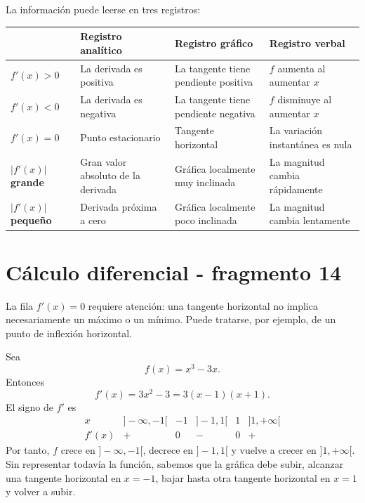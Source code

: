 La información puede leerse en tres registros:

\begin{center}

\begin{tabularx}{\textwidth}{@{}>{\bfseries}lXXX@{}}
\toprule
 & Registro analítico & Registro gráfico & Registro verbal \\
\midrule
$f'(x)>0$ & La derivada es positiva & La tangente tiene pendiente positiva & $f$ aumenta al aumentar $x$ \\
$f'(x)<0$ & La derivada es negativa & La tangente tiene pendiente negativa & $f$ disminuye al aumentar $x$ \\
$f'(x)=0$ & Punto estacionario & Tangente horizontal & La variación instantánea es nula \\
$|f'(x)|$ grande & Gran valor absoluto de la derivada & Gráfica localmente muy inclinada & La magnitud cambia rápidamente \\
$|f'(x)|$ pequeño & Derivada próxima a cero & Gráfica localmente poco inclinada & La magnitud cambia lentamente \\
\bottomrule
\end{tabularx}
\end{center}


\section{Cálculo diferencial - fragmento 14}
La fila $f'(x)=0$ requiere atención: una tangente horizontal no implica necesariamente un máximo o un mínimo. Puede tratarse, por ejemplo, de un punto de inflexión horizontal.

\begin{example}
Sea
\[
f(x)=x^3-3x.
\]
Entonces
\[
f'(x)=3x^2-3=3(x-1)(x+1).
\]
El signo de $f'$ es
\[
\begin{array}{c|ccccc}
x & ]-\infty,-1[ & -1 & ]-1,1[ & 1 & ]1,+\infty[\\
\hline
f'(x) & + & 0 & - & 0 & +
\end{array}
\]
Por tanto, $f$ crece en $]-\infty,-1[$, decrece en $]-1,1[$ y vuelve a crecer en $]1,+\infty[$. Sin representar todavía la función, sabemos que la gráfica debe subir, alcanzar una tangente horizontal en $x=-1$, bajar hasta otra tangente horizontal en $x=1$ y volver a subir.
\end{example}

